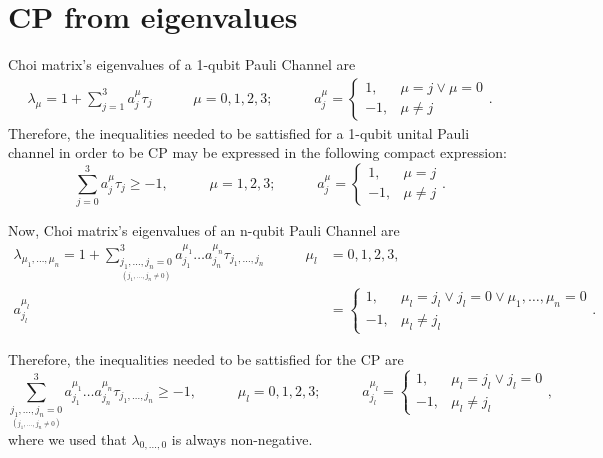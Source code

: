 \section{CP from eigenvalues} %
Choi matrix's eigenvalues of a 1-qubit Pauli Channel are
\begin{align}
\lambda_{\mu}=1+\sum_{j=1}^3a_j^{\mu}\tau_j
\hspace{35pt}
\mu=0,1,2,3;
\hspace{35pt}
a_j^{\mu}=\left\{ \begin{array}{rl}
             1, & \mu=j \lor \mu=0\\
             -1, & \mu\neq j
             \end{array}
   \right..
\end{align}
Therefore, the inequalities needed to be sattisfied for a 1-qubit 
unital Pauli channel in order to be CP may be expressed in the 
following compact expression:
\begin{equation}
\sum_{j=0}^3a_j^{\mu}\tau_j\geq -1,
\hspace{35pt}
\mu=1,2,3;
\hspace{35pt}
a_j^{\mu}=\left\{ \begin{array}{rl}
             1, & \mu=j\\
             -1, & \mu\neq j
             \end{array}
   \right..
\end{equation}

Now, Choi matrix's eigenvalues of an n-qubit Pauli Channel are
\begin{align}\label{eq:eigvals-PCE}
\lambda_{\mu_1,\ldots,\mu_n}=1+
\sum_{\underset{(j_1,\ldots,j_n\neq0)}{j_1,\ldots,j_n=0}}^3
a_{j_1}^{\mu_1}\ldots a_{j_n}^{\mu_n}\tau_{j_1,\ldots,j_n}
\hspace{35pt}
\mu_l&=0,1,2,3,\nonumber\\
a_{j_l}^{\mu_l}&=\left\{ \begin{array}{rl}
             1, & \mu_l=j_l \lor j_l=0\lor \mu_1,\ldots,\mu_n=0\\
             -1, & \mu_l\neq j_l
             \end{array}
   \right..
\end{align}

Therefore, the inequalities needed to be sattisfied for the CP are
\begin{equation}\label{eq:inequalities-PCE}
\sum_{\underset{(j_1,\ldots,j_n\neq0)}{j_1,\ldots,j_n=0}}^3
a_{j_1}^{\mu_1}\ldots a_{j_n}^{\mu_n}\tau_{j_1,\ldots,j_n}
\geq
-1,
\hspace{35pt}
\mu_l=0,1,2,3;
\hspace{35pt}
a_{j_l}^{\mu_l}=\left\{ \begin{array}{rl}
             1, & \mu_l=j_l \lor j_l=0\\
             -1, & \mu_l\neq j_l
             \end{array}
   \right.,
\end{equation}
where we used that $\lambda_{0,\ldots,0}$ is always non-negative.
